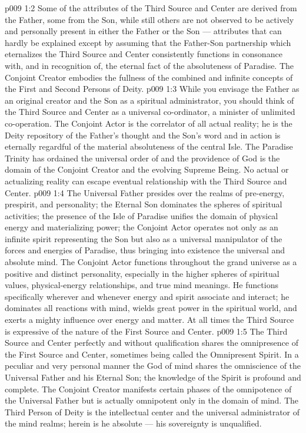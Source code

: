 \vs p009 1:2 Some of the attributes of the Third Source and Center are derived from the Father, some from the Son, while still others are not observed to be actively and personally present in either the Father or the Son --- attributes that can hardly be explained except by assuming that the Father\hyp{}Son partnership which eternalizes the Third Source and Center consistently functions in consonance with, and in recognition of, the eternal fact of the absoluteness of Paradise. The Conjoint Creator embodies the fullness of the combined and infinite concepts of the First and Second Persons of Deity.
\vs p009 1:3 \pc While you envisage the Father as an original creator and the Son as a spiritual administrator, you should think of the Third Source and Center as a universal co\hyp{}ordinator, a minister of unlimited co\hyp{}operation. The Conjoint Actor is the correlator of all actual reality; he is the Deity repository of the Father’s thought and the Son’s word and in action is eternally regardful of the material absoluteness of the central Isle. The Paradise Trinity has ordained the universal order of  and the providence of God is the domain of the Conjoint Creator and the evolving Supreme Being. No actual or actualizing reality can escape eventual relationship with the Third Source and Center.
\vs p009 1:4 \pc The Universal Father presides over the realms of pre\hyp{}energy, prespirit, and personality; the Eternal Son dominates the spheres of spiritual activities; the presence of the Isle of Paradise unifies the domain of physical energy and materializing power; the Conjoint Actor operates not only as an infinite spirit representing the Son but also as a universal manipulator of the forces and energies of Paradise, thus bringing into existence the universal and absolute mind. The Conjoint Actor functions throughout the grand universe as a positive and distinct personality, especially in the higher spheres of spiritual values, physical\hyp{}energy relationships, and true mind meanings. He functions specifically wherever and whenever energy and spirit associate and interact; he dominates all reactions with mind, wields great power in the spiritual world, and exerts a mighty influence over energy and matter. At all times the Third Source is expressive of the nature of the First Source and Center.
\vs p009 1:5 \pc The Third Source and Center perfectly and without qualification shares the omnipresence of the First Source and Center, sometimes being called the Omnipresent Spirit. In a peculiar and very personal manner the God of mind shares the omniscience of the Universal Father and his Eternal Son; the knowledge of the Spirit is profound and complete. The Conjoint Creator manifests certain phases of the omnipotence of the Universal Father but is actually omnipotent only in the domain of mind. The Third Person of Deity is the intellectual center and the universal administrator of the mind realms; herein is he absolute --- his sovereignty is unqualified.
